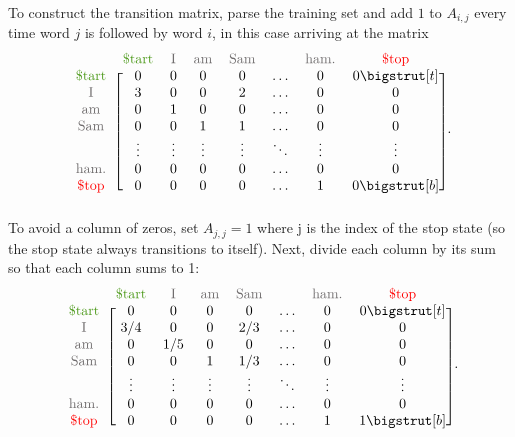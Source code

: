 To construct the transition matrix, parse the training set and add $1$ to $A_{i,j}$ every time word $j$ is followed by word $i$, in this case arriving at the matrix
%
\begin{align*}
\begin{blockarray}{cccccccc}
& \text{\textcolor[rgb]{.3,.6,.1}{\$tart}} & \textcolor{gray}{\text{I}} & \textcolor{gray}{\text{am}} & \textcolor{gray}{\text{Sam}} & & \textcolor{gray}{\text{ham.}} & \text{\textcolor[rgb]{1,0,0}{\$top}} \\
\begin{block}{c[ccccccc]}
\text{\textcolor[rgb]{.3,.6,.1}{\$tart}}    & 0 & 0 & 0 & 0 & \ldots & 0 & 0 \topstrut \\
\textcolor{gray}{\text{I}}        & 3 & 0 & 0 & 2 & \ldots & 0 & 0\\
\textcolor{gray}{\text{am}}       & 0 & 1 & 0 & 0 & \ldots & 0 & 0\\
\textcolor{gray}{\text{Sam}}      & 0 & 0 & 1 & 1 & \ldots & 0 & 0\\
& \vdots & \vdots & \vdots & \vdots & \ddots & \vdots & \vdots\\
\textcolor{gray}{\text{ham.}}     & 0 & 0 & 0 & 0 & \ldots & 0 & 0\\
\text{\textcolor[rgb]{1,0,0}{\$top}}        & 0 & 0 & 0 & 0 & \ldots & 1 & 0 \botstrut \\
\end{block}\end{blockarray}.
\end{align*}
To avoid a column of zeros, set $A_{j,j} = 1$ where j is the index of the stop state (so the stop state always transitions to itself).
Next, divide each column by its sum so that each column sums to 1:
\begin{align*}
\begin{blockarray}{cccccccc}
& \text{\textcolor[rgb]{.3,.6,.1}{\$tart}} & \textcolor{gray}{\text{I}} & \textcolor{gray}{\text{am}} & \textcolor{gray}{\text{Sam}} & & \textcolor{gray}{\text{ham.}} & \text{\textcolor[rgb]{1,0,0}{\$top}} \\
\begin{block}{c[ccccccc]}
\text{\textcolor[rgb]{.3,.6,.1}{\$tart}} & 0 & 0 & 0 & 0 & \ldots & 0 & 0 \topstrut\\
\textcolor{gray}{\text{I}}        & 3/4 & 0 & 0 & 2/3 & \ldots & 0 & 0\\
\textcolor{gray}{\text{am}}       & 0 & 1/5 & 0 & 0 & \ldots & 0 & 0\\
\textcolor{gray}{\text{Sam}}      & 0 & 0 & 1 & 1/3 & \ldots & 0 & 0\\
& \vdots & \vdots & \vdots & \vdots & \ddots & \vdots & \vdots\\
\textcolor{gray}{\text{ham.}}     & 0 & 0 & 0 & 0 & \ldots & 0 & 0\\
\text{\textcolor[rgb]{1,0,0}{\$top}}    & 0 & 0 & 0 & 0 & \ldots & 1 & 1 \botstrut\\
\end{block}\end{blockarray}.
\end{align*}

